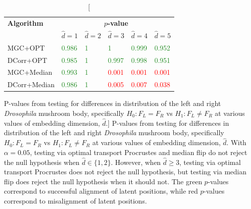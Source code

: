\begin{table}
\centering
\begin{tabular}{llllll}
\toprule
\textbf{Algorithm} &       \multicolumn{5}{c}{\textbf{$p$-value}}      \\
\cmidrule(lr){2-6} 
  &      $\hat d = 1$ &    $\hat d = 2$ &  $\hat d = 3$ & $\hat d = 4$ & $\hat d = 5$ \\
\midrule
MGC+OPT      &  \textcolor{ForestGreen}{0.986} &  \textcolor{ForestGreen}{1} &  \textcolor{ForestGreen}{1} &  \textcolor{ForestGreen}{0.999} &  \textcolor{ForestGreen}{0.952} \\
DCorr+OPT    &  \textcolor{ForestGreen}{0.985} &  \textcolor{ForestGreen}{1} &  \textcolor{ForestGreen}{0.997} &  \textcolor{ForestGreen}{0.998} &  \textcolor{ForestGreen}{0.951} \\
MGC+Median   &  \textcolor{ForestGreen}{0.993} &  \textcolor{ForestGreen}{1} &  \textcolor{Red}{0.001} &  \textcolor{Red}{0.001} &  \textcolor{Red}{0.001} \\
DCorr+Median &  \textcolor{ForestGreen}{0.986} &  \textcolor{ForestGreen}{1} &  \textcolor{Red}{0.005} &  \textcolor{Red}{0.007} &  \textcolor{Red}{0.038} \\
\bottomrule
\end{tabular}
\caption
[P-values from testing for differences in distribution of the left and right \textit{Drosophila} mushroom body, specifically $H_0: F_L = F_R$ vs $H_1: F_L \neq F_R$ at various values of embedding dimension, $\hat d$.]
{P-values from testing for differences in distribution of the left and right \textit{Drosophila} mushroom body, specifically $H_0: F_L = F_R$ vs $H_1: F_L \neq F_R$ at various values of embedding dimension, $\hat d$. With $\alpha=0.05$, testing via optimal transport Procrustes and median flip do not reject the null hypothesis when $\hat d \in \{1, 2\}$. However, when $\hat d \geq 3$, testing via optimal transport Procrustes does not reject the null hypothesis, but testing via median flip does reject the null hypothesis when it should not. The green $p$-values correspond to successful alignment of latent positions, while red $p$-values correspond to misalignment of latent positions.}
\label{tab:pvals}
\end{table}


